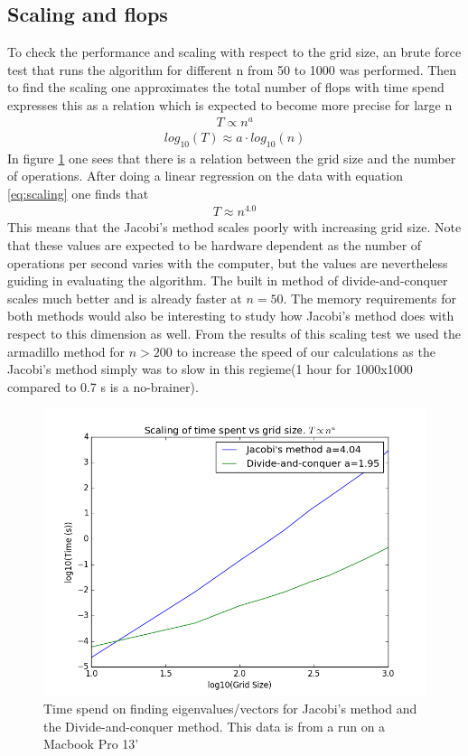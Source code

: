 \documentclass[a4paper,11pt]{article}
\begin{document}
{\subsection{Scaling and flops}
To check the performance and scaling with respect to the grid size, an brute force test that runs the algorithm for different n from 50 to 1000 was performed. Then to find the scaling one approximates the total number of flops with time spend expresses this as a relation which is expected to become more precise for large n
\begin{align}
	T \propto n^{a} 
\end{align}
\begin{align}
	log_{10}(T) \approx a\cdot log_{10}(n)
	\label{eq:scaling}
\end{align}
In figure \ref{fig:scaling} one sees that there is a relation between the grid size and the number of operations. After doing a linear regression on the data with equation \ref{eq:scaling} one finds that 
\begin{align}
	T \approx n^{4.0}
\end{align}
This means that the Jacobi's method scales poorly with increasing grid size. Note that these values are expected to be hardware dependent as the number of operations per second varies with the computer, but the values are nevertheless guiding in evaluating the algorithm. The built in method of divide-and-conquer scales much better and is already faster at $n=50$. The memory requirements for both methods would also be interesting to study how Jacobi's method does with respect to this dimension as well. From the results of this scaling test we used the armadillo method for $n>200$ to increase the speed of our calculations as the Jacobi's method simply was to slow in this regieme(1 hour for 1000x1000 compared to 0.7 s is a no-brainer). 
\begin{figure}
	\centering
	\includegraphics[scale=0.6]{Project2_scaling_time}
	\caption{Time spend on finding eigenvalues/vectors for Jacobi's method and the Divide-and-conquer method.  This data is from a run on a Macbook Pro 13' }
	\label{fig:scaling}
\end{figure}







}
\end{document}
